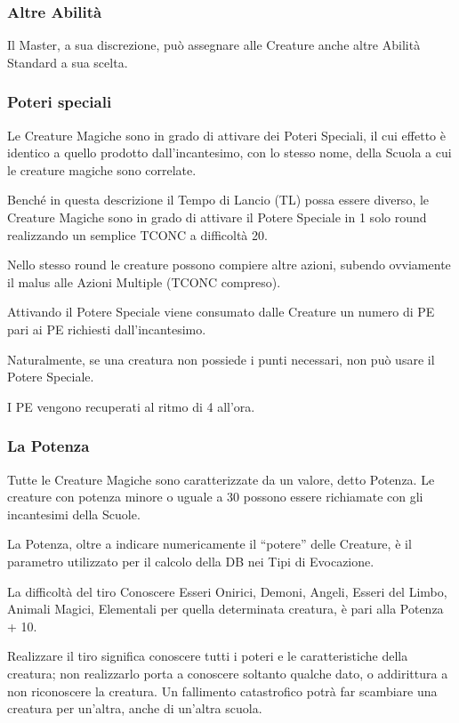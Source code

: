 \subsubsection{Altre Abilit\`a} 

Il Master, a sua discrezione,
pu\`o assegnare alle Creature anche altre Abilit\`a Standard a sua
scelta.

\subsubsection{Poteri speciali}
 
Le Creature Magiche sono in grado di attivare dei Poteri Speciali, il
cui effetto \`e identico a quello prodotto dall'incantesimo, con lo
stesso nome, della Scuola a cui le creature magiche sono correlate.

Bench\'e in questa descrizione il Tempo di Lancio (TL) possa essere
diverso, le Creature Magiche sono in grado di attivare il Potere
Speciale in 1 solo round realizzando un semplice TCONC a
difficolt\`a 20.

Nello stesso round le creature possono compiere altre azioni, subendo
ovviamente il malus alle Azioni Multiple (TCONC compreso). 

Attivando il Potere Speciale viene consumato dalle Creature un numero
di PE pari ai PE richiesti dall'incantesimo.  

Naturalmente, se una creatura non possiede i punti necessari, non
pu\`o usare il Potere Speciale.

I PE vengono recuperati al ritmo di 4 all'ora.

\subsubsection{La Potenza} 

Tutte le Creature Magiche sono caratterizzate da un valore, detto
Potenza. Le creature con potenza minore o uguale a 30 possono essere
richiamate con gli incantesimi della Scuole.

La Potenza, oltre a indicare numericamente il ``potere'' delle
Creature, \`e il parametro utilizzato per il calcolo della DB nei
Tipi di Evocazione.

La difficolt\`a del tiro Conoscere Esseri Onirici, Demoni, Angeli,
Esseri del Limbo, Animali Magici, Elementali per quella determinata
creatura, \`e pari alla Potenza + 10.

Realizzare il tiro significa conoscere tutti i poteri e le
caratteristiche della creatura; non realizzarlo porta a conoscere
soltanto qualche dato, o addirittura a non riconoscere la creatura.
Un fallimento catastrofico potr\`a far scambiare una creatura per
un'altra, anche di un'altra scuola.


